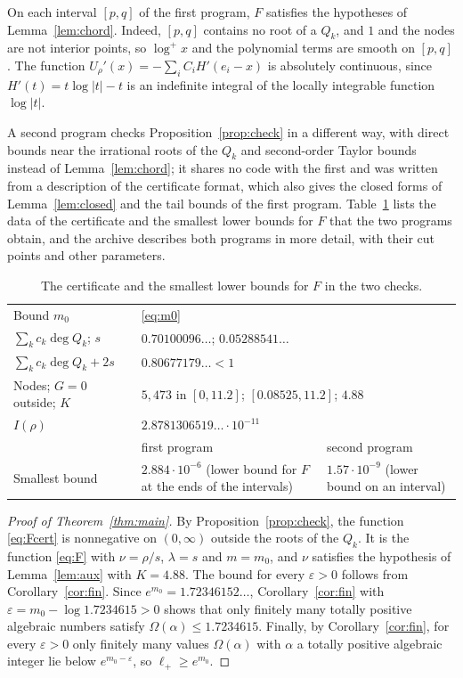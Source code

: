 \documentclass[11pt]{amsart}
\theoremstyle{remark}
\numberwithin{equation}{section}
\newcommand{\logp}{\log^{+}}
\newcommand{\EMzero}{1.7234615}
\newcommand{\EMzeroLong}{1.72346152}
\newcommand{\NNodes}{5{,}473}
\newcommand{\Sval}{0.05288541}
\newcommand{\DegSum}{0.70100096}
\newcommand{\Budget}{0.80677179}
\newcommand{\Kconst}{4.88}
\newcommand{\Ival}{2.8781306519\ldots\cdot10^{-11}}
\newcommand{\SuppLo}{0.08525}
\newcommand{\SuppHi}{11.2}
\newcommand{\MinEndA}{2.884\cdot10^{-6}}
\newcommand{\MinCertB}{1.57\cdot10^{-9}}
\begin{document}
On each interval $[p,q]$ of the first program, $F$ satisfies the hypotheses of Lemma~\ref{lem:chord}. Indeed, $[p,q]$ contains no root of a $Q_k$, and $1$ and the nodes are not interior points, so $\logp x$ and the polynomial terms are smooth on $[p,q]$. The function $U_\rho'(x)=-\sum_iC_iH'(e_i-x)$ is absolutely continuous, since $H'(t)=t\log|t|-t$ is an indefinite integral of the locally integrable function $\log|t|$.

A second program checks Proposition~\ref{prop:check} in a different way, with direct bounds near the irrational roots of the $Q_k$ and second-order Taylor bounds instead of Lemma~\ref{lem:chord}; it shares no code with the first and was written from a description of the certificate format, which also gives the closed forms of Lemma~\ref{lem:closed} and the tail bounds of the first program. Table~\ref{tab:checks} lists the data of the certificate and the smallest lower bounds for $F$ that the two programs obtain, and the archive describes both programs in more detail, with their cut points and other parameters.

\begin{table}[ht]
\centering
\caption{The certificate and the smallest lower bounds for $F$ in the two checks.}\label{tab:checks}
\small
\begin{tabular}{@{}p{}p{}p{}@{}}
\toprule
Bound $m_0$ & \multicolumn{2}{l}{\eqref{eq:m0}}\\
$\sum_kc_k\deg Q_k$; $s$ & \multicolumn{2}{l}{$\DegSum\ldots$; $\Sval\ldots$}\\
$\sum_kc_k\deg Q_k+2s$ & \multicolumn{2}{l}{$\Budget\ldots<1$}\\
Nodes; $G=0$ outside; $K$ & \multicolumn{2}{l}{$\NNodes$ in $[0,\SuppHi]$; $[\SuppLo,\SuppHi]$; $\Kconst$}\\
$I(\rho)$ & \multicolumn{2}{l}{$\Ival$}\\
\midrule
 & first program & second program\\
\midrule
Smallest bound & $\MinEndA$ (lower bound for $F$ at the ends of the intervals) & $\MinCertB$ (lower bound on an interval)\\
\bottomrule
\end{tabular}
\end{table}

\begin{proof}[Proof of Theorem~\ref{thm:main}]
By Proposition~\ref{prop:check}, the function \eqref{eq:Fcert} is nonnegative on $(0,\infty)$ outside the roots of the $Q_k$. It is the function \eqref{eq:F} with $\nu=\rho/s$, $\lambda=s$ and $m=m_0$, and $\nu$ satisfies the hypothesis of Lemma~\ref{lem:aux} with $K=\Kconst$. The bound for every $\varepsilon>0$ follows from Corollary~\ref{cor:fin}. Since $e^{m_0}=\EMzeroLong\ldots$, Corollary~\ref{cor:fin} with $\varepsilon=m_0-\log\EMzero>0$ shows that only finitely many totally positive algebraic numbers satisfy $\Omega(\alpha)\le\EMzero$. Finally, by Corollary~\ref{cor:fin}, for every $\varepsilon>0$ only finitely many values $\Omega(\alpha)$ with $\alpha$ a totally positive algebraic integer lie below $e^{m_0-\varepsilon}$, so $\ell_+\ge e^{m_0}$.
\end{proof}
\end{document}
